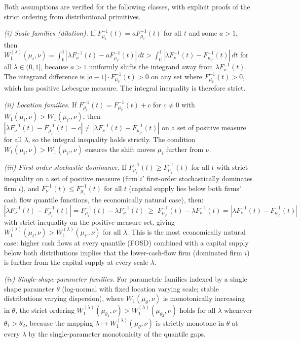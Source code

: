 \begin{remark}
\label{rem:w1_monotone_scope}
Both assumptions are verified for the following classes, with explicit proofs of the strict ordering from distributional primitives.

\emph{(i) Scale families (dilation).} If $F_{\mu_i}^{-1}(t) = a F_{\mu_{i'}}^{-1}(t)$ for all $t$ and some $a > 1$, then $W_1^{(\lambda)}(\mu_i,\nu) = \int_0^1|\lambda F_\nu^{-1}(t) - a F_{\mu_{i'}}^{-1}(t)|\,dt > \int_0^1|\lambda F_\nu^{-1}(t) - F_{\mu_{i'}}^{-1}(t)|\,dt$ for all $\lambda \in (0,1]$, because $a > 1$ uniformly shifts the integrand away from $\lambda F_\nu^{-1}(t)$. The integrand difference is $|a - 1| \cdot F_{\mu_{i'}}^{-1}(t) > 0$ on any set where $F_{\mu_{i'}}^{-1}(t) > 0$, which has positive Lebesgue measure. The integral inequality is therefore strict.

\emph{(ii) Location families.} If $F_{\mu_i}^{-1}(t) = F_{\mu_{i'}}^{-1}(t) + c$ for $c \neq 0$ with $W_1(\mu_i,\nu) > W_1(\mu_{i'},\nu)$, then $|\lambda F_\nu^{-1}(t) - F_{\mu_{i'}}^{-1}(t) - c| \neq |\lambda F_\nu^{-1}(t) - F_{\mu_{i'}}^{-1}(t)|$ on a set of positive measure for all $\lambda$, so the integral inequality holds strictly. The condition $W_1(\mu_i,\nu) > W_1(\mu_{i'},\nu)$ ensures the shift moves $\mu_i$ further from $\nu$.

\emph{(iii) First-order stochastic dominance.} If $F_{\mu_{i'}}^{-1}(t) \geq F_{\mu_i}^{-1}(t)$ for all $t$ with strict inequality on a set of positive measure (firm $i'$ first-order stochastically dominates firm $i$), and $F_\nu^{-1}(t) \leq F_{\mu_i}^{-1}(t)$ for all $t$ (capital supply lies below both firms' cash flow quantile functions, the economically natural case), then:
\[
  |\lambda F_\nu^{-1}(t) - F_{\mu_i}^{-1}(t)| = F_{\mu_i}^{-1}(t) - \lambda F_\nu^{-1}(t) \;\geq\; F_{\mu_{i'}}^{-1}(t) - \lambda F_\nu^{-1}(t) = |\lambda F_\nu^{-1}(t) - F_{\mu_{i'}}^{-1}(t)|
\]
with strict inequality on the positive-measure set, giving $W_1^{(\lambda)}(\mu_i,\nu) > W_1^{(\lambda)}(\mu_{i'},\nu)$ for all $\lambda$. This is the most economically natural case: higher cash flows at every quantile (FOSD) combined with a capital supply below both distributions implies that the lower-cash-flow firm (dominated firm $i$) is further from the capital supply at every scale $\lambda$.

\emph{(iv) Single-shape-parameter families.} For parametric families indexed by a single shape parameter $\theta$ (log-normal with fixed location varying scale; stable distributions varying dispersion), where $W_1(\mu_\theta, \nu)$ is monotonically increasing in $\theta$, the strict ordering $W_1^{(\lambda)}(\mu_{\theta_1},\nu) > W_1^{(\lambda)}(\mu_{\theta_2},\nu)$ holds for all $\lambda$ whenever $\theta_1 > \theta_2$, because the mapping $\lambda \mapsto W_1^{(\lambda)}(\mu_\theta,\nu)$ is strictly monotone in $\theta$ at every $\lambda$ by the single-parameter monotonicity of the quantile gaps.


\end{remark}
